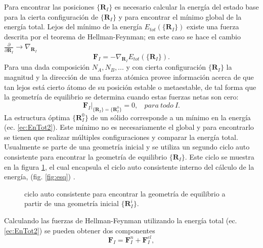    \newline
   Para encontrar las posiciones $ \{\pmb{R}_I \}$ es necesario calcular la energ\'ia del estado base para la cierta configuraci\'on de $ \{\pmb{R}_I \}$ y para encontrar el m\'inimo global  de la energ\'ia total. Lejos del m\'inimo de la energ\'ia $E_{tot} (\{\pmb{R}_I\})$ existe una fuerza descrita por el teorema de Hellman-Feynman; en este caso se hace el cambio $\frac{\partial}{\partial \pmb{R}_I}  \rightarrow \nabla_{\pmb{R}_I}$ \cite{MB-2015}
   \begin{equation}
   \pmb{F}_I = - \nabla_{\pmb{R}_I} E_{tot} (\{\pmb{R}_I\}). \label{ec:Fuerza_Et}
   \end{equation}
   Para una dada composici\'on $N_A,N_B, ...$ y con cierta configuraci\'on $\{\pmb{R}_I\}$ la magnitud y la direcci\'on de una fuerza at\'omica provee informaci\'on acerca de que tan lejos est\'a cierto \'atomo de su posici\'on estable o metaestable, de tal forma que la geometr\'ia de equilibrio se determina cuando estas fuerzas netas son cero:
   \begin{equation}
   \pmb{F}_I |_{\{\pmb{R}_I\}= \{\pmb{R}_I^0\}} = 0 , ~~~~para~ todo~ I .\label{ec:fuerzaEq}
   \end{equation}
   La estructura \'optima $\{\pmb{R}_I^0\}$ de un s\'olido corresponde a un m\'inimo en la energ\'ia (ec. \ref{ec:EnTot2}). Este m\'inimo no es necesariamente el global y para encontrarlo se tienen que realizar m\'ultiples configuraciones y comparar la energ\'ia total. Usualmente se parte de una geometr\'ia inicial y se utiliza un segundo ciclo auto consistente para encontrar la geometr\'ia de equilibrio $\{\pmb{R}_I\}$. Este ciclo se muestra en la figura \ref{fig:esqFuerza}, el cual encapsula el ciclo auto consistente interno del c\'alculo de la energ\'ia, (fig. \ref{fig:esq}) \cite{MB-2015}.
   \begin{figure}[!hbt]
   	\centering
   	\caption[C\'alculo auto consistente de fuerzas. ]{ciclo auto consistente para encontrar la geometr\'ia de equilibrio a partir de una geometr\'ia inicial $\{\pmb{R}_I^i\} $.}
   	\label{fig:esqFuerza}
   \end{figure}
   \newline
   Calculando las fuerzas de Hellman-Feynman utilizando la energ\'ia total (ec. \ref{ec:EnTot2}) se pueden obtener dos componentes \cite{doi:10.1080/00018738700101042}
   \begin{equation}
   	\pmb{F}_I = \pmb{F}_I^n + \pmb{F}_I^{el}, \label{ec:FuerzaDesc}
   \end{equation}
